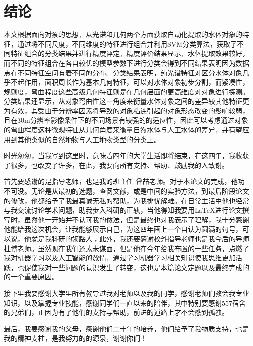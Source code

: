 \documentclass[supercite]{upcthesis}
\begin{document}
\section{结论}
	本文根据面向对象的思想，从光谱和几何两个方面获取自动化提取的水体对象的特征，通过将不同尺度，不同维度的特征进行组合并利用SVM分类算法，获取了不同特征组合的分类结果并进行精度评定，精度评价结果显示，水体提取效果较好，而不同的特征组合在各自较优的模型参数下进行分类会得到不同结果表明因为数据点在不同特征空间有着不同的分布。分类结果表明，纯光谱特征对区分水体对象几乎不起作用，面积周长作为基本几何特征，可以对水体对象初步分割，而紧凑性，规则度，弯曲程度这些高级几何特征则是在几何层面的更高维度对对象进行探测。分类结果还显示，从对象弯曲性这一角度来衡量水体对象之间的差异较其他特征更为有效，其受由于分辨率因素将导致的对象粘连引起的对象形态改变的影响较弱，且在30m分辨率影像条件下的不同场景有较强的的适应性，因此可以考虑通过对象的弯曲程度这种微观特征从几何角度来衡量自然水体与人工水体的差异，并有望应用到其他类似的自然地物与人工地物类型的分类上。
\begin{thankpage}
	时光匆匆，当我写到这里时，意味着四年的大学生活即将结束，在这四年，我收获了很多，也改变了许多，在此，我要向所有支持、帮助、鼓励我的人致谢。
	
	首先要感谢的是指导老师，也是我的班主任
	\raisebox{0.5mm}{------}曾喆老师。对于本论文的完成，他功不可没。无论是从最初的选题，查阅文献，或是中间的实验方法，到最后阶段论文的修改，他都给予了我最真诚无私的帮助，为我排忧解难。在日常生活中他也经常与我交流讨论学术问题，助我步入科研的正轨，当他得知我要用\LaTeX{}进行论文撰写时，虽然他一开始并不认可我的做法，但是最终也对我表示了理解，我十分感谢他能给我这次机会，让我能够展示自己，为这四年画上一个自认为圆满的句号，可以说，他就是我科研的领路人；此外，我还要感谢校外指导老师也是我今后的导师
	\raisebox{0.5mm}{------}杜博老师。虽然现在我们还素未谋面，但是他在今年给我布置的一些任务，点燃了我对机器学习以及人工智能的激情，通过学习机器学习相关知识使我思维更加活跃，也促使我对一些问题的认识发生了转变，这也是本篇论文定题以及最终完成的的一个重要原因。
	
	接下里我要感谢大学里所有教导过我对老师以及我的同学，感谢老师们教会我专业知识，以及掌握专业技能，感谢同学们一直以来的陪伴，其中特别要感谢557宿舍的兄弟们，正因为有了他们的支持与帮助，前进的道路上才不会感到孤独。
	
	最后，我要感谢我的父母，感谢他们二十年的培养，他们给予了我物质支持，也是我的精神支柱，是我努力的的源泉，谢谢你们！
\end{thankpage}


\end{document}
